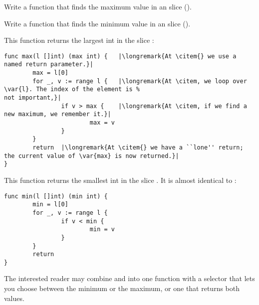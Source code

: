 \begin{Exercise}[title={Minimum and maximum},difficulty=0]
\label{ex:minmax}
\Question\label{ex:minmax q1} Write a function that finds the
maximum value in an  slice ().

\Question\label{ex:minmax q2} Write a function that finds the
minimum value in an  slice ().

\end{Exercise}

\begin{Answer}
\Question This function returns the largest int in the slice :
\begin{lstlisting}
func max(l []int) (max int) {   |\longremark{At \citem{} we use a named return parameter.}|
        max = l[0]      
        for _, v := range l {   |\longremark{At \citem, we loop over \var{l}. The index of the element is %
not important,}|
                if v > max {    |\longremark{At \citem, if we find a new maximum, we remember it.}|
                        max = v 
                }   
        }   
        return  |\longremark{At \citem{} we have a ``lone'' return; the current value of \var{max} is now returned.}|
}
\end{lstlisting}
\showremarks

\Question This function returns the smallest int in the slice . It is almost identical to :
\begin{lstlisting}
func min(l []int) (min int) {
        min = l[0]
        for _, v := range l { 
                if v < min {
                        min = v 
                }   
        }   
        return
}
\end{lstlisting}
The interested reader may combine  and  into one function with a selector
that lets you choose between the minimum or the maximum, or one that returns both values.
\end{Answer}
